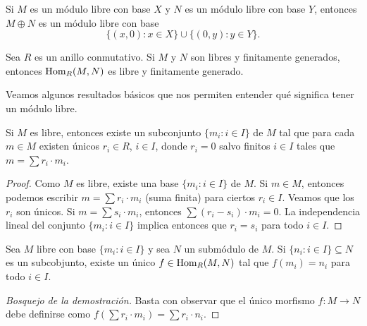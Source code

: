 \begin{example}
Si $M$ es un módulo libre con base $X$ y $N$ es un módulo libre con base $Y$, entonces
$M\oplus N$ es un módulo libre con base 
\[
\{(x,0):x\in X\}\cup \{(0,y):y\in Y\}.
\]	
\end{example}

\begin{exercise}
Sea $R$ es un anillo conmutativo. Si $M$ y $N$ son libres y finitamente generados, entonces
$\operatorname{Hom}_R(M,N)$ es libre y finitamente generado.	
\end{exercise}

Veamos algunos resultados básicos que nos permiten entender qué significa tener un módulo libre. 

\begin{proposition}
Si $M$ es libre, entonces existe un subconjunto $\{m_i:i\in I\}$ de $M$ tal que 
para cada $m\in M$ existen únicos $r_i\in R$, $i\in I$, 
donde $r_i=0$ salvo finitos $i\in I$ 
tales que $m=\sum r_i\cdot m_i$. 
\end{proposition}

\begin{proof}
Como $M$ es libre, existe una base $\{m_i:i\in I\}$ de $M$. Si $m\in M$, entonces
podemos escribir $m=\sum r_i\cdot m_i$ (suma finita) para ciertos $r_i\in I$. Veamos que los $r_i$ son únicos. Si $m=\sum s_i\cdot m_i$, entonces
$\sum (r_i-s_i)\cdot m_i=0$. La independencia lineal del conjunto $\{m_i:i\in I\}$ implica entonces que $r_i=s_i$ para todo $i\in I$.  	
\end{proof}

\begin{proposition}
\label{pro:libre}
Sea $M$ libre con base $\{m_i:i\in I\}$ y sea $N$ un submódulo de $M$. Si $\{n_i:i\in I\}\subseteq N$ es un subcobjunto, existe
un único $f\in\operatorname{Hom}_R(M,N)$ tal que $f(m_i)=n_i$ para todo $i\in I$.  
\end{proposition}

\begin{proof}[Bosquejo de la demostración]
Basta con observar que el único morfismo $f\colon M\to N$ debe definirse como $f(\sum r_i\cdot m_i)=\sum r_i\cdot n_i$.  	
\end{proof}

